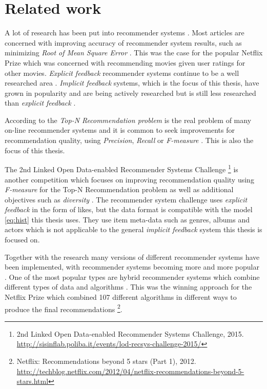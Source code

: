 \chapter{Related work}\label{cha:relwork}

A lot of research has been put into recommender systems \citep{bobadilla2013recommender, takacs2012alternating, lu2012recommender, bennett2007netflix, su2009survey}. Most articles are concerned with improving accuracy of recommender system results, such as minimizing \textit{Root of Mean Square Error} \prmse. This was the case for the popular Netflix Prize \citep{bennett2007netflix} which was concerned with recommending movies given user ratings for other movies. \textit{Explicit feedback} recommender systems continue to be a well researched area \citep{bobadilla2013recommender, takacs2012alternating, lu2012recommender, su2009survey}. \textit{Implicit feedback} systems, which is the focus of this thesis, have grown in popularity and are being actively researched but is still less researched than \textit{explicit feedback} \citep{hu2008collaborative, bobadilla2013recommender, takacs2012alternating}.

According to \citep{lai2012hybrid} the \textit{Top-N Recommendation problem} is the real problem of many on-line recommender systems and it is common to seek improvements for recommendation quality, using \textit{Precision}, \textit{Recall} or \textit{F-measure} \citep{bobadilla2013recommender, takacs2012alternating, herlocker2004evaluating}. This is also the focus of this thesis.

The 2nd Linked Open Data-enabled Recommender Systems Challenge
\footnote{2nd Linked Open Data-enabled Recommender Systems Challenge, 2015. \url{http://sisinflab.poliba.it/events/lod-recsys-challenge-2015/}}
is another competition which focuses on improving recommendation quality using \textit{F-measure} for the Top-N Recommendation problem as well as additional objectives such as \textit{diversity} \citep{bobadilla2013recommender}. The recommender system challenge uses \textit{explicit feedback} in the form of likes, but the data format is compatible with the model \eqref{eq:hist} this thesis uses. They use item meta-data such as genres, albums and actors which is not applicable to the general \textit{implicit feedback} system this thesis is focused on.

Together with the research many versions of different recommender systems have been implemented, with recommender systems becoming more and more popular \citep{bobadilla2013recommender, su2009survey}. One of the most popular types are hybrid recommender systems which combine different types of data and algorithms \citep{bobadilla2013recommender, lai2012hybrid}. This was the winning approach for the Netflix Prize which combined 107 different algorithms in different ways to produce the final recommendations
\footnote{ Netflix: Recommendations beyond 5 stars (Part 1), 2012. \url{http://techblog.netflix.com/2012/04/netflix-recommendations-beyond-5-stars.html} }.

